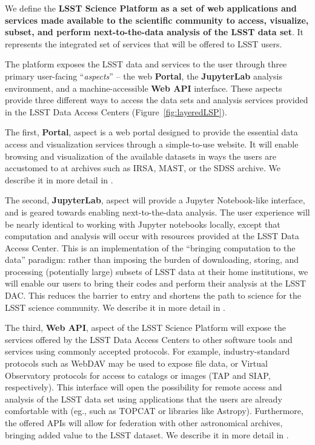 We define the \textbf{LSST Science Platform as a set of web applications and services
made available to the scientific community to access, visualize, subset, and
perform next-to-the-data analysis of the LSST data set}. It represents the integrated
set of services that will be offered to LSST users.

The platform exposes the LSST data
and services to the user through three primary user-facing ``\textit{aspects}'' -- the web \textbf{Portal},
the \textbf{JupyterLab} analysis environment, and a machine-accessible \textbf{Web API} interface. These aspects provide three different ways to access the data sets and analysis services provided in the LSST Data Access Centers (Figure~\ref{fig:layeredLSP}).

The first, \textbf{Portal}, aspect is a web portal designed to provide the essential data
access and visualization services through a simple-to-use website.  It will
enable browsing and visualization of the available datasets in ways the
users are accustomed to at archives such as IRSA, MAST, or the SDSS archive.
We describe it in more detail in .

The second, \textbf{JupyterLab}, aspect will provide a Jupyter Notebook-like interface, and
is geared towards enabling next-to-the-data analysis. The user experience will
be nearly identical to working with Jupyter notebooks locally, except that computation
and analysis will occur with resources provided at the LSST Data Access Center.  This is an
implementation of the “bringing computation to the data” paradigm: rather
than imposing the burden of downloading, storing, and processing (potentially large)
subsets of LSST data at their home institutions, we will enable our users to
bring their codes and perform their analysis at the LSST DAC.
This reduces the barrier to entry and shortens the path to science for
the LSST science community. We describe it in more detail in .

The third, \textbf{Web API}, aspect of the LSST Science Platform will expose the
services offered by the LSST Data Access Centers to other software tools and
services using commonly accepted protocols. For example, industry-standard
protocols such as WebDAV may be used to expose file data, or Virtual Observatory
protocols for access to catalogs or images (TAP and SIAP, respectively). This interface will open the
possibility for remote access and analysis of the LSST  data set using
applications that the users are already comfortable with (eg., such as TOPCAT
or libraries like Astropy). Furthermore, the offered APIs will allow for federation
with other astronomical archives, bringing added value to the LSST dataset.
We describe it in more detail in .

